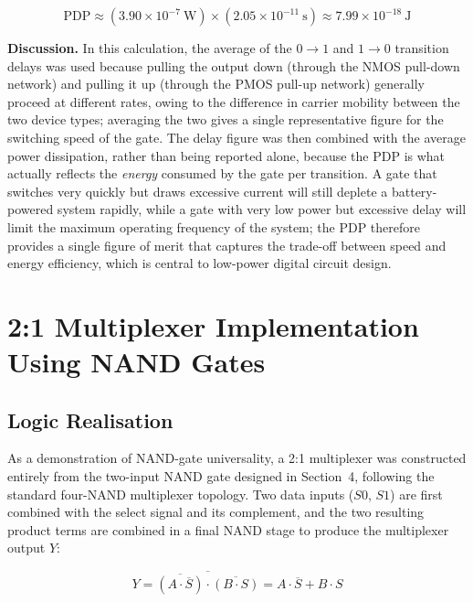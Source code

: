 \documentclass[11pt,a4paper]{article}
\begin{document}
\begin{equation}
\mathrm{PDP} \approx (3.90\times10^{-7}\ \text{W}) \times (2.05\times10^{-11}\ \text{s}) \approx 7.99\times10^{-18}\ \text{J}
\end{equation}

\textbf{Discussion.} In this calculation, the average of the $0 \rightarrow 1$
and $1 \rightarrow 0$ transition delays was used because pulling the
output down (through the NMOS pull-down network) and pulling it up
(through the PMOS pull-up network) generally proceed at different rates,
owing to the difference in carrier mobility between the two device types;
averaging the two gives a single representative figure for the switching
speed of the gate. The delay figure was then combined with the average
power dissipation, rather than being reported alone, because the PDP is
what actually reflects the \emph{energy} consumed by the gate per
transition. A gate that switches very quickly but draws excessive
current will still deplete a battery-powered system rapidly, while a
gate with very low power but excessive delay will limit the maximum
operating frequency of the system; the PDP therefore provides a single
figure of merit that captures the trade-off between speed and energy
efficiency, which is central to low-power digital circuit design.

\section{2:1 Multiplexer Implementation Using NAND Gates}

\subsection{Logic Realisation}
As a demonstration of NAND-gate universality, a 2:1 multiplexer was
constructed entirely from the two-input NAND gate designed in
Section~4, following the standard four-NAND multiplexer topology. Two
data inputs ($S0$, $S1$) are first combined with the select signal and
its complement, and the two resulting product terms are combined in a
final NAND stage to produce the multiplexer output $Y$:

\begin{equation}
Y = \overline{\overline{(A \cdot \overline{S})} \cdot \overline{(B \cdot S)}}
  = A\cdot\overline{S} + B\cdot S
\end{equation}
\end{document}
